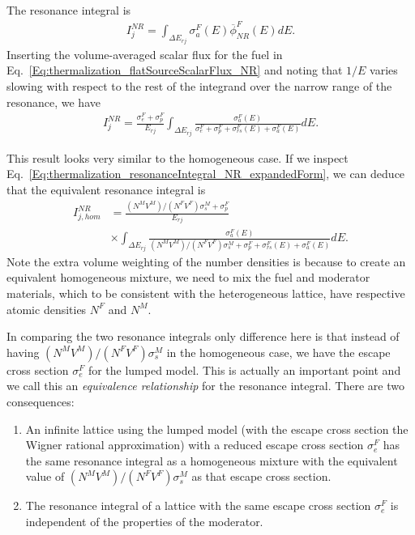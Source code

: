 The resonance integral is
\begin{align}
  I_j^{NR} = \int_{\Delta E_{rj}} \sigma_a^F(E) \overline{\phi}^F_{NR}(E) dE.
\end{align}
Inserting the volume-averaged scalar flux for the fuel in Eq.~\eqref{Eq:thermalization_flatSourceScalarFlux_NR} and noting that $1/E$ varies slowing with respect to the rest of the integrand over the narrow range of the resonance, we have
\begin{align}
  I_j^{NR} = \frac{\sigma_e^F + \sigma_p^F}{E_{rj}} \int_{\Delta E_{rj}} \frac{ \sigma_a^F(E) }{ \sigma_e^F + \sigma_p^F + \sigma_{rs}^F(E) + \sigma_a^F(E) } dE. \label{Eq:thermalization_resonanceIntegral_NR_flatSource}
\end{align}

This result looks very similar to the homogeneous case. If we inspect Eq.~\eqref{Eq:thermalization_resonanceIntegral_NR_expandedForm}, we can deduce that the equivalent resonance integral is
\begin{align}
  I_{j,hom}^{NR} &= \frac{(N^M V^M)/(N^F V^F) \sigma_s^M + \sigma_p^F }{E_{rj}} \nonumber \\
  &\times \int_{\Delta E_{rj}} \frac{ \sigma_a^F(E)  }{ (N^M V^M)/(N^F V^F) \sigma_s^M + \sigma_p^F + \sigma_{rs}^F(E) + \sigma_a^F(E) } dE . 
\end{align}
Note the extra volume weighting of the number densities is because to create an equivalent homogeneous mixture, we need to mix the fuel and moderator materials, which to be consistent with the heterogeneous lattice, have respective atomic densities $N^F$ and $N^M$. 

In comparing the two resonance integrals only difference here is that instead of having $(N^M V^M)/(N^F V^F) \sigma_s^M$ in the homogeneous case, we have the escape cross section $\sigma_e^F$ for the lumped model. This is actually an important point and we call this an \emph{equivalence relationship} for the resonance integral. There are two consequences:
\begin{enumerate}
  \item An infinite lattice using the lumped model (with the escape cross section the Wigner rational approximation) with a reduced escape cross section $\sigma_e^F$ has the same resonance integral as a homogeneous mixture with the equivalent value of $(N^M V^M)/(N^F V^F) \sigma_s^M$ as that escape cross section.
  \item The resonance integral of a lattice with the same escape cross section $\sigma_e^F$ is independent of the properties of the moderator.
\end{enumerate}

